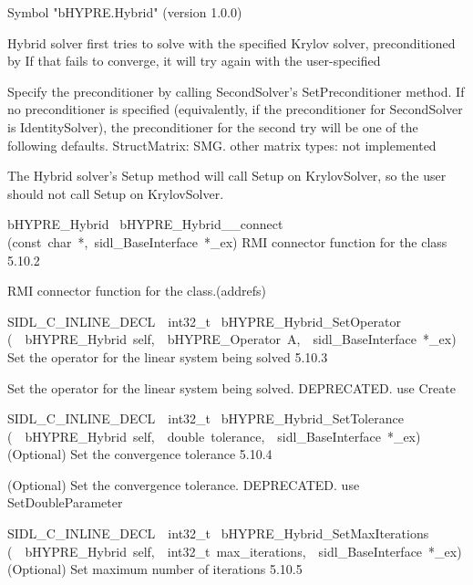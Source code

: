 \documentclass{article}
\begin{document}
\begin{cxxentry}
\begin{cxxentry}
\begin{cxxvariable}
\begin{cxxdoc}
Symbol "bHYPRE.Hybrid" (version 1.0.0)

Hybrid solver
first tries to solve with the specified Krylov solver, preconditioned by
If that fails to converge, it will try again with the user-specified

Specify the preconditioner  by calling SecondSolver's SetPreconditioner
method.  If no preconditioner is specified (equivalently, if the
preconditioner for SecondSolver is IdentitySolver), the preconditioner for
the second try will be one of the following defaults.
StructMatrix: SMG.  other matrix types: not implemented

The Hybrid solver's Setup method will call Setup on KrylovSolver, so the
user should not call Setup on KrylovSolver.
\end{cxxdoc}
\end{cxxvariable}
\begin{cxxfunction}
{bHYPRE\_Hybrid\ }
        {bHYPRE\_Hybrid\_\_connect}
        {(const\ char\ *,\ sidl\_BaseInterface\ *\_ex)}
        {
RMI connector function for the class}
        {5.10.2}
\begin{cxxdoc}

RMI connector function for the class.(addrefs)
\end{cxxdoc}
\end{cxxfunction}
\begin{cxxfunction}
{SIDL\_C\_INLINE\_DECL\ \ int32\_t\ }
        {bHYPRE\_Hybrid\_SetOperator}
        {(\ \ bHYPRE\_Hybrid\ self,\ \ bHYPRE\_Operator\ A,\ \ sidl\_BaseInterface\ *\_ex)}
        {
Set the operator for the linear system being solved}
        {5.10.3}
\begin{cxxdoc}

Set the operator for the linear system being solved.
DEPRECATED.  use Create
\end{cxxdoc}
\end{cxxfunction}
\begin{cxxfunction}
{SIDL\_C\_INLINE\_DECL\ \ int32\_t\ }
        {bHYPRE\_Hybrid\_SetTolerance}
        {(\ \ bHYPRE\_Hybrid\ self,\ \ double\ tolerance,\ \ sidl\_BaseInterface\ *\_ex)}
        {
(Optional) Set the convergence tolerance}
        {5.10.4}
\begin{cxxdoc}

(Optional) Set the convergence tolerance.
DEPRECATED.  use SetDoubleParameter
\end{cxxdoc}
\end{cxxfunction}
\begin{cxxfunction}
{SIDL\_C\_INLINE\_DECL\ \ int32\_t\ }
        {bHYPRE\_Hybrid\_SetMaxIterations}
        {(\ \ bHYPRE\_Hybrid\ self,\ \ int32\_t\ max\_iterations,\ \ sidl\_BaseInterface\ *\_ex)}
        {
(Optional) Set maximum number of iterations}
        {5.10.5}
\begin{cxxdoc}


\end{cxxdoc}
\end{cxxfunction}
\end{cxxentry}
\end{cxxentry}
\end{document}
